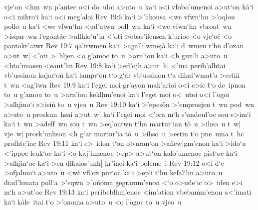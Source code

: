 vje`on
<hm~wn
p'antec
o<i
do~uloi
a>uto~u
ka`i
o<i
vfobo'umenoi
a>ut`on
k\r{a}`i
o<i
mikro`i
ka`i
o<i
meg'aloi\bibvsend
\vs Rev 19:6
ka`i
>'hkousa
<wc
vfwn`hn
>'oqlou
pollo~u
ka`i
<wc
vfwn`hn
<ud'atwn
poll~wn
ka`i
<wc
vfwn`hn
vbront~wn
>isqur~wn
l'egont\r{a}c
>allhlo'u"ia
<'oti
>ebas'ileusen
k'urioc
<o
vje`o\r{c}
<o
pantokr'atwr\bibvsend
\vs Rev 19:7
qa'irwmen
ka`i
>agalli'wmeja\r{}
ka`i
d~wmen
t`hn
d'oxan
a>ut~w|
<'oti
>~hljen
<o
g'amoc
to~u
>arn'iou
ka`i
<h
gun`h
a>uto~u
<hto'imasen
<eaut'hn\bibvsend
\vs Rev 19:8
ka`i
>ed'ojh
a>ut~h|
<'ina
perib'alhtai
vb'ussinon
kajar`on\r{}
ka`i
lampr`on
t`o
g`ar
vb'ussinon
t`a
dikai'wmat'a
>estin\r{}
t~wn
<ag'iwn\bibvsend
\vs Rev 19:9
ka`i
l'egei
moi
gr'ayon
mak'arioi
o<i
e>ic
\r{t}`o
de~ipnon
to~u
g'amou
to~u
>arn'iou
keklhm'enoi
ka`i
l'egei
moi
o<~utoi
o<i
l'ogoi
>alhjino`i
e>isin\r{}
to~u
vjeo~u\bibvsend
\vs Rev 19:10
ka`i
>'epes\r{o}n
>'emprosjen
t~wn
pod~wn
a>uto~u
proskun~hsai
a>ut~w|
ka`i
l'egei
moi
<'ora
m`h
s'undoul'oc
sou
e>im`i
ka`i
t~wn
>adelf~wn
sou
t~wn
>eq'ontwn
t`hn
martur'ian
t\r{o}~u
>ihso~u
t~w|
vje~w|
prosk'unhson
<h
g`ar
martur'ia
t\r{o}~u
>ihso~u
>estin
t`o
pne~uma
t~hc
profhte'iac\bibvsend
\vs Rev 19:11
ka`i
e>~idon
t`on
o>uran`on
>a\r{n}ew|gm'enon
ka`i
>ido`u
<'ippoc
leuk`oc
ka`i
<o
kaj'hmenoc
>ep>
a>ut`on
kalo'umenoc
pist`oc
ka`i
>alhjin`oc
ka`i
>en
dikaios'unh|
kr'inei
ka`i
poleme~i\bibvsend
\vs Rev 19:12
o<i
d`e
>ofjalmo`i
a>uto~u
<w\r{c}
vfl`ox
pur`oc
ka`i
>ep`i
t`hn
kefal`hn
a>uto~u
diad'hmata
poll`a
>'eqwn
>'o\r{n}oma
gegramm'enon
<`o
o>ude`ic
o>~iden
e>i
m`h
a>ut'oc\bibvsend
\vs Rev 19:13
ka`i
peribeblhm'enoc
<im'ation
vbeba\r{m}m'enon
a<'imati
ka`i
k\r{a}le~itai
t`o
>'onoma
a>uto~u
<o
l'ogoc
to~u
vjeo~u\bibvsend
